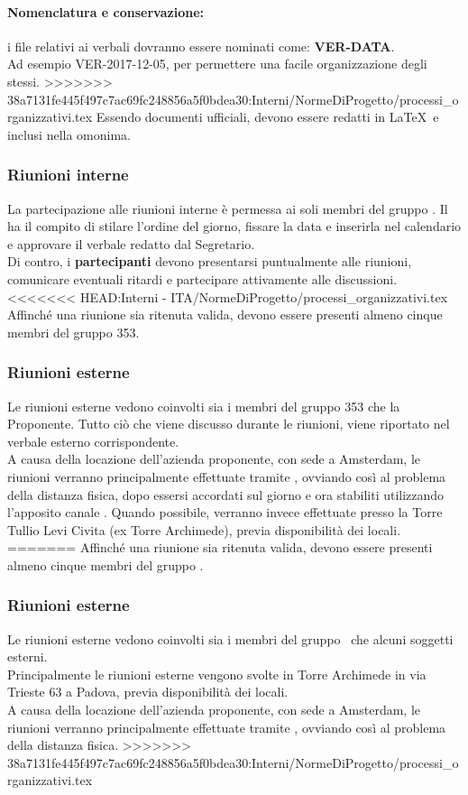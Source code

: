 \documentclass[NormeDiProgetto.tex]{subfiles}
\begin{document}
	\paragraph{Nomenclatura e conservazione:} i file relativi ai verbali dovranno essere nominati come: \textbf{VER-DATA}.\\
	Ad esempio VER-2017-12-05, per permettere una facile organizzazione degli stessi.
>>>>>>> 38a7131fe445f497c7ac69fc248856a5f0bdea30:Interni/NormeDiProgetto/processi_organizzativi.tex
	Essendo documenti ufficiali, devono essere redatti in \LaTeX\ e inclusi nella  omonima.
	
	\subsubsection{Riunioni interne}
	La partecipazione alle riunioni interne è permessa ai soli membri del gruppo \gruppo.
	Il \respdiprog{} ha il compito di stilare l'ordine del giorno, fissare la data e inserirla nel calendario e approvare il verbale redatto dal Segretario.\\
	Di contro, i \textbf{partecipanti} devono presentarsi puntualmente alle riunioni, comunicare eventuali ritardi e partecipare attivamente alle discussioni.\\
<<<<<<< HEAD:Interni - ITA/NormeDiProgetto/processi_organizzativi.tex
	Affinché una riunione sia ritenuta valida, devono essere presenti almeno cinque membri del gruppo 353.
	
	\subsubsection{Riunioni esterne}
	Le riunioni esterne vedono coinvolti sia i membri del gruppo 353 che la Proponente.
	Tutto ciò che viene discusso durante le riunioni, viene riportato nel verbale esterno corrispondente.\\
	A causa della locazione dell'azienda proponente, con sede a Amsterdam, le riunioni verranno principalmente effettuate tramite , ovviando così al problema della distanza fisica, dopo essersi accordati sul giorno e ora stabiliti utilizzando l'apposito canale .
	Quando possibile, verranno invece effettuate presso la Torre Tullio Levi Civita (ex Torre Archimede), previa disponibilità dei locali.
=======
	Affinché una riunione sia ritenuta valida, devono essere presenti almeno cinque membri del gruppo \gruppo.
	\subsubsection{Riunioni esterne}
	Le riunioni esterne vedono coinvolti sia i membri del gruppo \gruppo\ che alcuni soggetti esterni.\\
	Principalmente le riunioni esterne vengono svolte in Torre Archimede in via Trieste 63 a Padova, previa disponibilità dei locali.\\
	A causa della locazione dell'azienda proponente, con sede a Amsterdam, le riunioni verranno principalmente effettuate tramite , ovviando così al problema della distanza fisica.
>>>>>>> 38a7131fe445f497c7ac69fc248856a5f0bdea30:Interni/NormeDiProgetto/processi_organizzativi.tex
	
\end{document}
